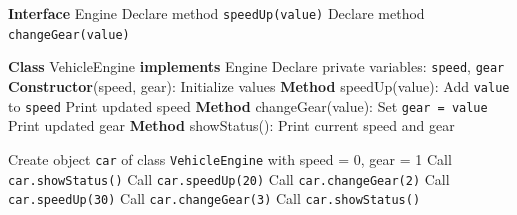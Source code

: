 \begin{algorithm}[H]
\caption{Interface \texttt{Engine} and Class \texttt{VehicleEngine}}
\begin{algorithmic}[1]
\STATE \textbf{Interface} Engine
\STATE \quad Declare method \texttt{speedUp(value)}
\STATE \quad Declare method \texttt{changeGear(value)}

\STATE \textbf{Class} VehicleEngine \textbf{implements} Engine
\STATE \quad Declare private variables: \texttt{speed}, \texttt{gear}
\STATE \quad \textbf{Constructor}(speed, gear): Initialize values
\STATE \quad \textbf{Method} speedUp(value):
\STATE \quad \quad Add \texttt{value} to \texttt{speed}
\STATE \quad \quad Print updated speed
\STATE \quad \textbf{Method} changeGear(value):
\STATE \quad \quad Set \texttt{gear = value}
\STATE \quad \quad Print updated gear
\STATE \quad \textbf{Method} showStatus():
\STATE \quad \quad Print current speed and gear
\end{algorithmic}
\end{algorithm}

\begin{algorithm}[H]
\caption{Testing Engine Functionality in \texttt{TestVehicleEngine}}
\begin{algorithmic}[1]
\STATE Create object \texttt{car} of class \texttt{VehicleEngine} with speed = 0, gear = 1
\STATE Call \texttt{car.showStatus()}
\STATE Call \texttt{car.speedUp(20)}
\STATE Call \texttt{car.changeGear(2)}
\STATE Call \texttt{car.speedUp(30)}
\STATE Call \texttt{car.changeGear(3)}
\STATE Call \texttt{car.showStatus()}
\end{algorithmic}
\end{algorithm}